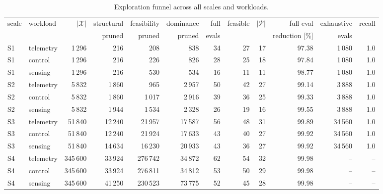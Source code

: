\documentclass[pdflatex,sn-nature]{sn-jnl}
\theoremstyle{thmstyleone}
\theoremstyle{thmstyletwo}
\theoremstyle{thmstylethree}
\begin{document}
\begin{table}[!htbp]\centering
\caption{Exploration funnel across all scales and workloads.}\label{tabS11}
{\let\scriptsize\tiny\setlength{\tabcolsep}{2pt}\scriptsize
\setlength{\tabcolsep}{3.5pt}
\begin{tabular}{llrrrrrrrrrr}
\toprule
scale & workload & $|\mathcal{X}|$ & structural & feasibility & dominance & full & feasible & $|\mathcal{P}|$ & full-eval & exhaustive & recall \\
 & & & pruned & pruned & pruned & evals & & & reduction [\%] & evals & \\
\midrule
S1 & telemetry & 1\,296 & 216 & 208 & 838 & 34 & 27 & 17 & 97.38 & 1\,080 & 1.0 \\
S1 & control & 1\,296 & 216 & 226 & 826 & 28 & 25 & 18 & 97.84 & 1\,080 & 1.0 \\
S1 & sensing & 1\,296 & 216 & 530 & 534 & 16 & 11 & 11 & 98.77 & 1\,080 & 1.0 \\
S2 & telemetry & 5\,832 & 1\,860 & 965 & 2\,957 & 50 & 42 & 27 & 99.14 & 3\,888 & 1.0 \\
S2 & control & 5\,832 & 1\,860 & 1\,017 & 2\,916 & 39 & 36 & 25 & 99.33 & 3\,888 & 1.0 \\
S2 & sensing & 5\,832 & 1\,944 & 1\,534 & 2\,328 & 26 & 19 & 16 & 99.55 & 3\,888 & 1.0 \\
S3 & telemetry & 51\,840 & 12\,240 & 21\,957 & 17\,587 & 56 & 48 & 31 & 99.89 & 34\,560 & 1.0 \\
S3 & control & 51\,840 & 12\,240 & 21\,924 & 17\,633 & 43 & 40 & 27 & 99.92 & 34\,560 & 1.0 \\
S3 & sensing & 51\,840 & 14\,634 & 16\,230 & 20\,933 & 43 & 36 & 27 & 99.92 & 34\,560 & 1.0 \\
S4 & telemetry & 345\,600 & 33\,924 & 276\,742 & 34\,872 & 62 & 54 & 32 & 99.98 & -- & -- \\
S4 & control & 345\,600 & 33\,924 & 276\,811 & 34\,812 & 53 & 50 & 29 & 99.98 & -- & -- \\
S4 & sensing & 345\,600 & 41\,250 & 230\,523 & 73\,775 & 52 & 45 & 28 & 99.98 & -- & -- \\
\bottomrule
\end{tabular}}
\end{table}
\end{document}
